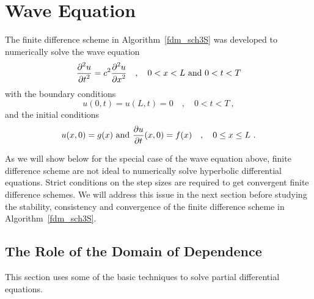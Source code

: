 \section{Wave Equation}

The finite difference scheme in Algorithm~\ref{fdm_sch3S} was
developed to numerically solve the wave equation
\begin{equation} \label{waveLT1}
  \frac{\displaystyle \partial^{2}{u}} {\displaystyle \partial{t}^{2}} = c^2 \frac{\displaystyle \partial^{2}{u}} {\displaystyle \partial{x}^{2}} \quad , \quad
  0 < x < L \ \text{and} \ 0<t<T
\end{equation}
with the boundary conditions
\begin{equation} \label{waveLT2}
u(0,t)=u(L,t)=0 \quad , \quad 0<t<T \ ,
\end{equation}
and the initial conditions
\begin{equation} \label{waveLT3}
u(x,0) = g(x) \ \text{and} \ \frac{\partial{u}}{\partial{t}}(x,0) = f(x) \quad , \quad
 0 \leq x \leq L \ .
\end{equation}

As we will show below for the special case of the wave equation
above, finite difference scheme are not ideal to numerically solve
hyperbolic differential equations.  Strict conditions on the step sizes
are required to get convergent finite difference schemes.  We will
address this issue in the next section before studying the stability,
consistency and convergence of the finite difference scheme in
Algorithm~\ref{fdm_sch3S}.

\subsection{The Role of the Domain of Dependence} \label{DomDepHyp}

This section uses some of the basic techniques to solve partial
differential equations.

